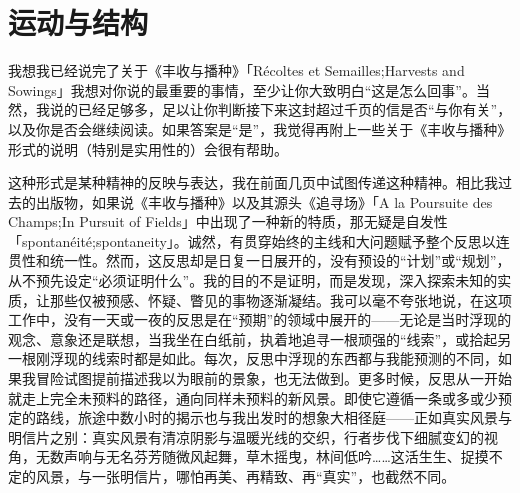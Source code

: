 \section{运动与结构}

我想我已经说完了关于《丰收与播种》「Récoltes et Semailles;Harvests and Sowings」我想对你说的最重要的事情，至少让你大致明白“这是怎么回事”。当然，我说的已经足够多，足以让你判断接下来这封超过千页的信是否“与你有关”，以及你是否会继续阅读。如果答案是“是”，我觉得再附上一些关于《丰收与播种》形式的说明（特别是实用性的）会很有帮助。

这种形式是某种精神的反映与表达，我在前面几页中试图传递这种精神。相比我过去的出版物，如果说《丰收与播种》以及其源头《追寻场》「A la Poursuite des Champs;In Pursuit of Fields」中出现了一种新的特质，那无疑是自发性「spontanéité;spontaneity」。诚然，有贯穿始终的主线和大问题赋予整个反思以连贯性和统一性。然而，这反思却是日复一日展开的，没有预设的“计划”或“规划”，从不预先设定“必须证明什么”。我的目的不是证明，而是发现，深入探索未知的实质，让那些仅被预感、怀疑、瞥见的事物逐渐凝结。我可以毫不夸张地说，在这项工作中，没有一天或一夜的反思是在“预期”的领域中展开的——无论是当时浮现的观念、意象还是联想，当我坐在白纸前，执着地追寻一根顽强的“线索”，或拾起另一根刚浮现的线索时都是如此。每次，反思中浮现的东西都与我能预测的不同，如果我冒险试图提前描述我以为眼前的景象，也无法做到。更多时候，反思从一开始就走上完全未预料的路径，通向同样未预料的新风景。即使它遵循一条或多或少预定的路线，旅途中数小时的揭示也与我出发时的想象大相径庭——正如真实风景与明信片之别：真实风景有清凉阴影与温暖光线的交织，行者步伐下细腻变幻的视角，无数声响与无名芬芳随微风起舞，草木摇曳，林间低吟……这活生生、捉摸不定的风景，与一张明信片，哪怕再美、再精致、再“真实”，也截然不同。

